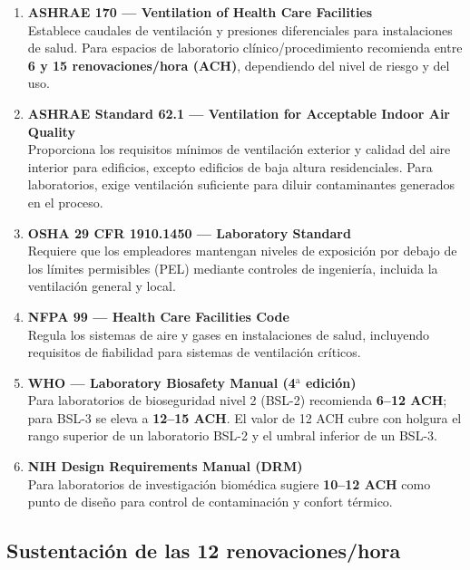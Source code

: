 \documentclass[12pt,a4paper]{article}
\begin{document}
\begin{enumerate}[leftmargin=*]
    \item \textbf{ASHRAE 170 --- Ventilation of Health Care Facilities}\\
    Establece caudales de ventilación y presiones diferenciales para instalaciones de salud. Para espacios de laboratorio clínico/procedimiento recomienda entre \textbf{6 y 15 renovaciones/hora (ACH)}, dependiendo del nivel de riesgo y del uso.

    \item \textbf{ASHRAE Standard 62.1 --- Ventilation for Acceptable Indoor Air Quality}\\
    Proporciona los requisitos mínimos de ventilación exterior y calidad del aire interior para edificios, excepto edificios de baja altura residenciales. Para laboratorios, exige ventilación suficiente para diluir contaminantes generados en el proceso.

    \item \textbf{OSHA 29 CFR 1910.1450 --- Laboratory Standard}\\
    Requiere que los empleadores mantengan niveles de exposición por debajo de los límites permisibles (PEL) mediante controles de ingeniería, incluida la ventilación general y local.

    \item \textbf{NFPA 99 --- Health Care Facilities Code}\\
    Regula los sistemas de aire y gases en instalaciones de salud, incluyendo requisitos de fiabilidad para sistemas de ventilación críticos.

    \item \textbf{WHO --- Laboratory Biosafety Manual (4$^\text{a}$ edición)}\\
    Para laboratorios de bioseguridad nivel 2 (BSL-2) recomienda \textbf{6--12 ACH}; para BSL-3 se eleva a \textbf{12--15 ACH}. El valor de 12 ACH cubre con holgura el rango superior de un laboratorio BSL-2 y el umbral inferior de un BSL-3.

    \item \textbf{NIH Design Requirements Manual (DRM)}\\
    Para laboratorios de investigación biomédica sugiere \textbf{10--12 ACH} como punto de diseño para control de contaminación y confort térmico.
\end{enumerate}

\subsection{Sustentación de las 12 renovaciones/hora}
\end{document}
